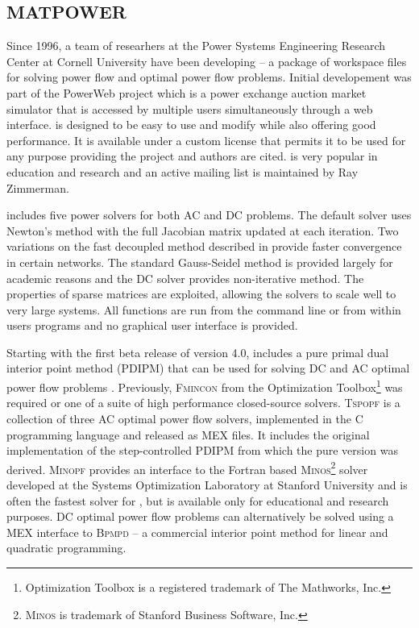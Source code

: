 \subsection{MATPOWER}
Since 1996, a team of researhers at the Power Systems Engineering Research
Center at Cornell University have been developing \matpower -- a package of
\matlab workspace files for solving power flow and optimal power flow problems.
Initial developement was part of the PowerWeb project which is a power
exchange auction market simulator that is accessed by multiple users
simultaneously through a web interface.  \matpower is designed to be easy to use
and modify while also offering good performance.  It is available under a
custom license that permits it to be used for any purpose providing the project
and authors are cited.  \matpower is very popular in education and research and
an active mailing list is maintained by Ray Zimmerman.

\matpower includes five power solvers for both AC and DC problems.  The default
solver uses Newton's method \cite{tinney:67} with the full Jacobian matrix
updated at each iteration.  Two variations on the fast decoupled method
\cite{stott:74} described in \cite{amerongen:89} provide faster convergence in
certain networks.  The standard Gauss-Seidel method \cite{glimn:57} is provided
largely for academic reasons and the DC solver provides non-iterative
method.  The properties of \matlab sparse matrices are exploited, allowing the
solvers to scale well to very large systems.  All functions are run from the
\matlab command line or from within users programs and no graphical user
interface is provided.

Starting with the first beta release of version 4.0, \matpower includes a pure
\matlab primal dual interior point method (PDIPM) that can be used for solving
DC and AC optimal power flow problems \cite{zimmerman:ccv}.  Previously,
\textsc{Fmincon} from the \matlab Optimization Toolbox\footnote{Optimization
Toolbox is a registered trademark of The Mathworks, Inc.} was required or one
of a suite of high performance closed-source solvers.  \textsc{Tspopf} is a
collection of three AC optimal power flow solvers, implemented in the C
programming language and released as \matlab MEX files.  It includes
the original implementation of the step-controlled PDIPM from which the pure
\matlab version was derived.  \textsc{Minopf} provides an interface to the
Fortran based \textsc{Minos}\footnote{\textsc{Minos} is trademark of Stanford
Business Software, Inc.} solver developed at the Systems Optimization Laboratory at Stanford University and is often the fastest solver for \matpower, but is
available only for educational and research purposes.  DC optimal power flow
problems can alternatively be solved using a MEX interface to \textsc{Bpmpd} --
a commercial interior point method for linear and quadratic programming.

